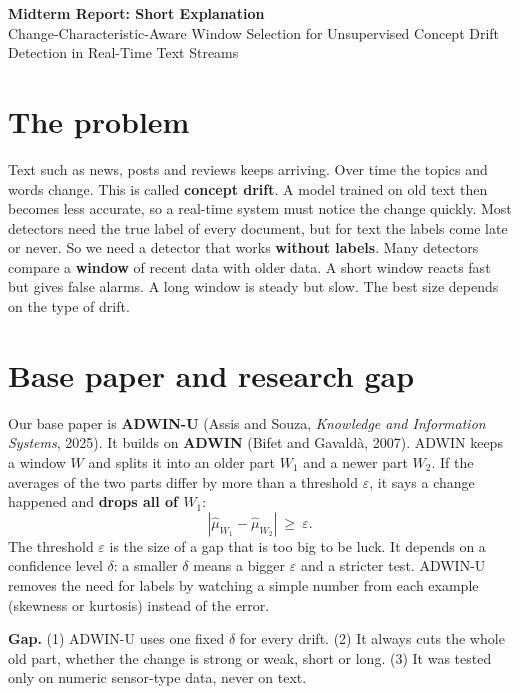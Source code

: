 \documentclass[10pt,a4paper]{article}
\begin{document}
\begin{center}
{\large\bfseries Midterm Report: Short Explanation}\\[1pt]
{\small Change-Characteristic-Aware Window Selection for Unsupervised Concept Drift Detection in Real-Time Text Streams}
\end{center}
\vspace{-4pt}

\section{The problem}
Text such as news, posts and reviews keeps arriving. Over time the topics and words change. This is called \textbf{concept drift}. A model trained on old text then becomes less accurate, so a real-time system must notice the change quickly. Most detectors need the true label of every document, but for text the labels come late or never. So we need a detector that works \textbf{without labels}. Many detectors compare a \textbf{window} of recent data with older data. A short window reacts fast but gives false alarms. A long window is steady but slow. The best size depends on the type of drift.

\section{Base paper and research gap}
Our base paper is \textbf{ADWIN-U} (Assis and Souza, \emph{Knowledge and Information Systems}, 2025). It builds on \textbf{ADWIN} (Bifet and Gavald\`a, 2007). ADWIN keeps a window $W$ and splits it into an older part $W_1$ and a newer part $W_2$. If the averages of the two parts differ by more than a threshold $\varepsilon$, it says a change happened and \textbf{drops all of $W_1$}:
\[
|\hat\mu_{W_1}-\hat\mu_{W_2}|\ \ge\ \varepsilon .
\]
The threshold $\varepsilon$ is the size of a gap that is too big to be luck. It depends on a confidence level $\delta$: a smaller $\delta$ means a bigger $\varepsilon$ and a stricter test. ADWIN-U removes the need for labels by watching a simple number from each example (skewness or kurtosis) instead of the error.

\textbf{Gap.} (1) ADWIN-U uses one fixed $\delta$ for every drift. (2) It always cuts the whole old part, whether the change is strong or weak, short or long. (3) It was tested only on numeric sensor-type data, never on text.
\end{document}
